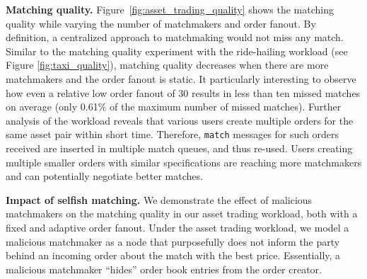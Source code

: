 \textbf{Matching quality.}
Figure~\ref{fig:asset_trading_quality} shows the matching quality while varying the number of matchmakers and order fanout.
By definition, a centralized approach to matchmaking would not miss any match.
Similar to the matching quality experiment with the ride-hailing workload (see Figure \ref{fig:taxi_quality}), matching quality decreases when there are more matchmakers and the order fanout is static.
It particularly interesting to observe how even a relative low order fanout of 30 results in less than ten missed matches on average (only 0.61\% of the maximum number of missed matches).
Further analysis of the workload reveals that various users create multiple orders for the same asset pair within short time.
Therefore, \texttt{match} messages for such orders received are inserted in multiple match queues, and thus re-used.
Users creating multiple smaller orders with similar specifications are reaching more matchmakers and can potentially negotiate better matches.



\textbf{Impact of selfish matching.}
We demonstrate the effect of malicious matchmakers on the matching quality in our asset trading workload, both with a fixed and adaptive order fanout.
Under the asset trading workload, we model a malicious matchmaker as a node that purposefully does not inform the party behind an incoming order about the match with the best price.
Essentially, a malicious matchmaker \enquote{hides} order book entries from the order creator.

